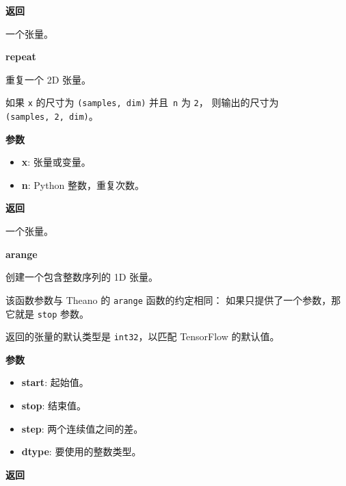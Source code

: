 \textbf{返回}

一个张量。


\textbf{repeat}\label{repeat}

\begin{Shaded}
\begin{Highlighting}[]
\end{Highlighting}
\end{Shaded}

重复一个 2D 张量。

如果 \texttt{x} 的尺寸为 \texttt{(samples,\ dim)} 并且~\texttt{n} 为
\texttt{2}， 则输出的尺寸为 \texttt{(samples,\ 2,\ dim)}。

\textbf{参数}

\begin{itemize}
\tightlist
\item
  \textbf{x}: 张量或变量。
\item
  \textbf{n}: Python 整数，重复次数。
\end{itemize}

\textbf{返回}

一个张量。


\textbf{arange}\label{arange}

\begin{Shaded}
\begin{Highlighting}[]
\OperatorTok{=}\OperatorTok{=}\OperatorTok{=}\NormalTok{)}
\end{Highlighting}
\end{Shaded}

创建一个包含整数序列的 1D 张量。

该函数参数与 Theano 的 \texttt{arange} 函数的约定相同：
如果只提供了一个参数，那它就是 \texttt{stop} 参数。

返回的张量的默认类型是 \texttt{int32}，以匹配 TensorFlow 的默认值。

\textbf{参数}

\begin{itemize}
\tightlist
\item
  \textbf{start}: 起始值。
\item
  \textbf{stop}: 结束值。
\item
  \textbf{step}: 两个连续值之间的差。
\item
  \textbf{dtype}: 要使用的整数类型。
\end{itemize}

\textbf{返回}

